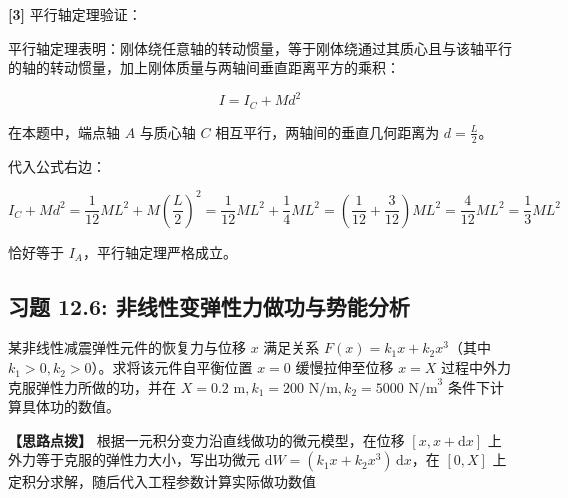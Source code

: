 \documentclass[11pt,a4paper,UTF8]{ctexart}
\begin{document}
\begin{solbox}[分步推导与答题规范]
\textbf{[3]} 平行轴定理验证：

平行轴定理表明：刚体绕任意轴的转动惯量，等于刚体绕通过其质心且与该轴平行的轴的转动惯量，加上刚体质量与两轴间垂直距离平方的乘积：


\begin{equation*}
I = I_C + M d^2
\end{equation*}


在本题中，端点轴 $A$ 与质心轴 $C$ 相互平行，两轴间的垂直几何距离为 $d = \frac{L}{2}$。

代入公式右边：


\begin{equation*}
I_C + M d^2 = \frac{1}{12}M L^2 + M \left(\frac{L}{2}\right)^2 = \frac{1}{12}M L^2 + \frac{1}{4}M L^2 = \left(\frac{1}{12} + \frac{3}{12}\right)M L^2 = \frac{4}{12}M L^2 = \frac{1}{3}M L^2
\end{equation*}


恰好等于 $I_A$，平行轴定理严格成立。
\end{solbox}


\subsection{习题 12.6: 非线性变弹性力做功与势能分析}

某非线性减震弹性元件的恢复力与位移 $x$ 满足关系 $F(x) = k_1 x + k_2 x^3$（其中 $k_1 > 0, k_2 > 0$）。求将该元件自平衡位置 $x = 0$ 缓慢拉伸至位移 $x = X$ 过程中外力克服弹性力所做的功，并在 $X = 0.2\text{ m}, k_1 = 200\text{ N/m}, k_2 = 5000\text{ N/m}^3$ 条件下计算具体功的数值。

\textbf{\color{DeepPurple}【思路点拨】} 根据一元积分变力沿直线做功的微元模型，在位移 $[x, x+\mathrm{d}x]$ 上外力等于克服的弹性力大小，写出功微元 $\mathrm{d}W = (k_1 x + k_2 x^3)\,\mathrm{d}x$，在 $[0, X]$ 上定积分求解，随后代入工程参数计算实际做功数值
\end{document}
